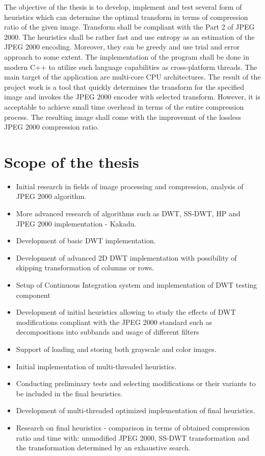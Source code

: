 The objective of the thesis is to develop, implement and test several form of heuristics which can determine
the optimal transform in terms of compression ratio of the given image. Transform shall be compliant with
the Part 2 of JPEG 2000. The heuristics shall be rather fast and use entropy as an estimation of the JPEG 2000 encoding.
Moreover, they can be greedy and use trial and error approach to some extent. The implementation of the program
shall be done in modern C++ to utilize such language capabilities as cross-platform threads. The main target of the
application are multi-core CPU architectures. The result of the project work is a tool that quickly determines 
the transform for the specified image and invokes the JPEG 2000 encoder with selected transform. However, it is acceptable
to achieve small time overhead in terms of the entire compression process. The resulting image shall come with the
improvemnt of the lossless JPEG 2000 compression ratio.

\section{Scope of the thesis}

\begin{itemize}
    \item Initial research in fields of image processing and compression, analysis of JPEG 2000 algorithm. 
    \item More advanced research of algorithms such as DWT, SS-DWT, HP and JPEG 2000 implementation - Kakadu.
    \item Development of basic DWT implementation.
    \item Development of advanced 2D DWT implementation with possibility of skipping transformation of columns or rows.
    \item Setup of Continuous Integration system and implementation of DWT testing component 
    \item Development of initial heuristics allowing to study the effects of DWT modifications compliant
    with the JPEG 2000 standard such as decompositions into subbands and usage of different filters
    \item Support of loading and storing both grayscale and color images.
    \item Initial implementation of multi-threaded heuristics.
    \item Conducting preliminary tests and selecting modifications or their variants to be included in the final heuristics.
    \item Development of multi-threaded optimized implementation of final heuristics.
    \item Research on final heuristics - comparison in terms of obtained compression ratio and time with: unmodified JPEG 2000,
    SS-DWT transformation and the transformation determined by an exhaustive search.
\end{itemize}


